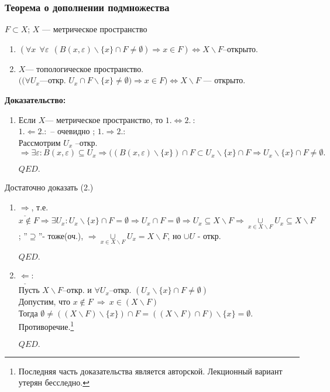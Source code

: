 \documentclass{article}
\begin{document}
\begin{spacing}{1.5}
\subsubsection{Теорема о дополнении подмножества}
$F\subset X$;  $X$ --- метрическое пространство
\begin{enumerate}
\item $(\forall x~~ \forall\varepsilon~~(B(x,\varepsilon)\backslash\lbrace x\rbrace\cap F\neq\emptyset)\Rightarrow x\in F)\Longleftrightarrow X\backslash F$--открыто.
\item $X$--- топологическое пространство.\\
$((\forall U_{x}$---откр. $U_{x}\cap F\backslash\lbrace x\rbrace\neq \emptyset) \Rightarrow x\in F)\Longleftrightarrow X\backslash F$ --- открыто.
\end{enumerate}
\textbf{Доказательство:}
 \begin{enumerate}
 \item Если $X$--- метрическое пространство, то $1.\Longleftrightarrow 2.~:$
 \\ $ 1.\Leftarrow 2.:$ -- очевидно
 ; $ 1.\Rightarrow 2.:$
 \\Рассмотрим $ U_{x}$ --откр. $\Rightarrow \exists\varepsilon: B(x, \varepsilon)\subseteq U_{x}\Rightarrow((B(x, \varepsilon)\backslash\lbrace x\rbrace ) \cap F\subset U_{x}\backslash\lbrace x\rbrace\cap F\Rightarrow U_{x}\backslash\lbrace x\rbrace\cap F\neq \emptyset.$
 \begin{flushright}
$QED.$
\end{flushright}
 \end{enumerate}
Достаточно доказать (2.)
 \begin{enumerate}
 \item $\underline{\Rightarrow}$, т.е. $x\notin F \Rightarrow \exists U_{x}: U_{x}\backslash \lbrace x\rbrace\cap F=\emptyset\Rightarrow U_{x}\cap F=\emptyset\Rightarrow U_{x}\subseteq X\backslash F\Rightarrow \underset{x\in X\backslash F}{\cup}U_{x}\subseteq X\backslash F  $
 ; ''$\supseteq$''- тоже(оч.), $\Rightarrow\underset{x\in X\backslash F}{\cup}U_{x}= X\backslash F$, но $\cup U$ - откр.
 \begin{flushright}
$QED.$
\end{flushright}
\item $\underline{\Leftarrow} :$
\\ Пусть $X\backslash F$--откр. и $\forall U_{x}$--откр.   $(U_{x}\backslash\lbrace x\rbrace\cap F\neq\emptyset)$ 
\\Допустим, что $x\notin F~\Rightarrow ~ x\in (X\backslash F)$
\\Тогда $\emptyset \neq ((X\backslash F)\backslash\lbrace x\rbrace)\cap F = ((X\backslash F)\cap F)\backslash \lbrace x\rbrace = \emptyset.$ Противоречие.\footnote{Последняя часть доказательства является авторской. Лекционный вариант утерян бесследно.}
 \begin{flushright}
$QED.$
\end{flushright}
  \end{enumerate}
  
\end{spacing}
\end{document}

